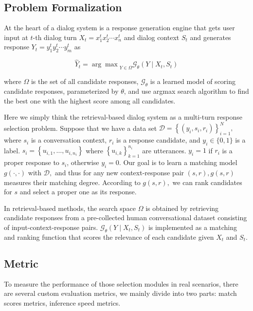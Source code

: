 \documentclass{article}
\begin{document}
\subsection{Problem Formalization}

 At the heart of a dialog system is a response generation engine that gets user input at $t$-th dialog turn $X_{t}=x_{1}^{t} x_{2}^{t} \cdots x_{n}^{t}$ and dialog context $S_{t}$  and generates response $Y_{t}=y_{1}^{t} y_{2}^{t} \cdots y_{m}^{t}$ as

\begin{equation}
\hat{Y}_{t}={\arg \max }_{Y \in \Omega} \mathcal{G}_{\theta}\left(Y \mid X_{t}, S_{t}\right)
\end{equation}

where $\Omega$ is the set of all candidate responses, $\mathcal{G}_{\theta}$ is a learned model of scoring candidate responses, parameterized by $\theta$, and use argmax  search algorithm to find the best one with the highest score among all candidates. \par

Here we simply think the retrieval-based dialog system as a multi-turn response selection problem. Suppose that we have a data set $\mathcal{D}=\left\{\left(y_{i}, s_{i}, r_{i}\right)\right\}_{i=1}^{N},$ where $s_{i}$ is a conversation context, $r_{i}$ is a response candidate, and $y_{i} \in\{0,1\}$ is a label. $s_{i}=\left\{u_{i, 1}, \ldots, u_{i, n_{i}}\right\}$ where $\left\{u_{i, k}\right\}_{k=1}^{n_{i}}$ are utterances. $y_{i}=1$ if $r_{i}$ is a proper response to $s_{i}$, otherwise $y_{i}=0 .$ Our goal is to learn a matching model $g(\cdot, \cdot)$ with $\mathcal{D},$ and thus for any new context-response pair $(s, r), g(s, r)$ measures their matching degree. According to $g(s, r),$ we can rank candidates for $s$ and select a proper one as its response.

In retrieval-based methods, the search space $\Omega$ is obtained by retrieving candidate responses from a pre-collected human conversational dataset consisting of input-context-response pairs. $\mathcal{G}_{\theta}\left(Y \mid X_{t}, S_{t}\right)$ is implemented as a matching and ranking function that scores the relevance of each candidate given $X_{t}$ and $S_{t} .$

\subsection{Metric}

To measure the performance of those selection modules in real scenarios, there are several custom evaluation metrics, we mainly divide into two parts: match scores metrics, inference speed metrics.
\end{document}
